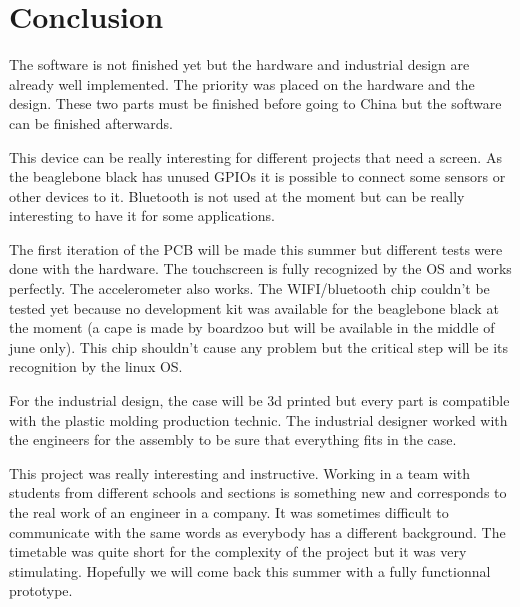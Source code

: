 \section{Conclusion}

The software is not finished yet but the hardware and industrial design are already well implemented. The priority was placed on the hardware and the design. These two parts must be finished before going to China but the software can be finished afterwards.

This device can be really interesting for different projects that need a screen. As the beaglebone black has unused GPIOs it is possible to connect some sensors or other devices to it. Bluetooth is not used at the moment but can be really interesting to have it for some applications.

The first iteration of the PCB will be made this summer but different tests were done with the hardware. The touchscreen is fully recognized by the OS and works perfectly. The accelerometer also works. The WIFI/bluetooth chip couldn't be tested yet because no development kit was available for the beaglebone black at the moment (a cape is made by boardzoo but will be available in the middle of june only). This chip shouldn't cause any problem but the critical step will be its recognition by the linux OS.

For the industrial design, the case will be 3d printed but every part is compatible with the plastic molding production technic. The industrial designer worked with the engineers for the assembly to be sure that everything fits in the case.

This project was really interesting and instructive. Working in a team with students from different schools and sections is something new and corresponds to the real work of an engineer in a company. It was sometimes difficult to communicate with the same words as everybody has a different background. The timetable was quite short for the complexity of the project but it was very stimulating. Hopefully we will come back this summer with a fully functionnal prototype. 
